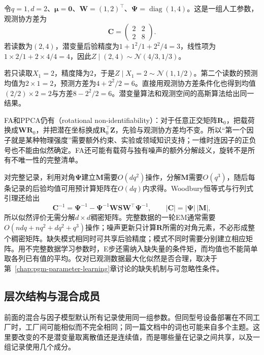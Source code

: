 \begin{example}[两台传感器对一个连续因子的测量]
  \label{ex:pgm-static-directed-fa-missing}
  令$q=1,d=2$、$\bm{\mu}=\bm{0}$、$\bm{W}=(1,2)^\top$、$\bm{\Psi}=\operatorname{diag}(1,4)$。这是一组人工参数，观测协方差为
  \[
    \bm{C}=\begin{pmatrix}2&2\\2&8\end{pmatrix}.
  \]
  若读数为$(2,4)$，潜变量后验精度为$1+1^2/1+2^2/4=3$，线性项为$1\times2/1+2\times4/4=4$，因此$Z\mid(2,4)\sim\mathcal{N}(4/3,1/3)$。

  若只读取$X_1=2$，精度降为$2$，于是$Z\mid X_1=2\sim\mathcal{N}(1,1/2)$。第二个读数的预测均值为$2\times1=2$，预测方差为$4+2^2/2=6$。直接用观测协方差条件化也得到均值$(2/2)\times2=2$与方差$8-2^2/2=6$。潜变量算法和观测空间的高斯算法给出同一结果。
\end{example}

FA和PPCA仍有（rotational non-identifiability）：对于任意正交矩阵$\bm{R}_0$，把载荷换成$\bm{W}\bm{R}_0$，并把潜在坐标换成$\bm{R}_0^\top\bm{Z}$，先验与观测协方差均不变。所以“第一个因子就是某种物理强度”需要额外约束、实验或领域知识支持；一维时连因子的正负号也不能由似然确定。FA还可能有载荷与独有噪声的额外分解歧义，旋转不是所有不唯一性的完整清单。

对完整记录，利用对角$\bm{\Psi}$建立$\bm{M}$需要$O(dq^2)$操作，分解$\bm{M}$需要$O(q^3)$，随后每条记录的后验均值可用预计算矩阵在$O(dq)$内求得。Woodbury恒等式与行列式引理还给出
\[
  \bm{C}^{-1}=\bm{\Psi}^{-1}
    -\bm{\Psi}^{-1}\bm{W}\bm{S}\bm{W}^{\top}\bm{\Psi}^{-1},
  \qquad |\bm{C}|=|\bm{\Psi}|\,|\bm{M}|,
\]
所以似然评价无需分解$d\times d$稠密矩阵。完整数据的一轮EM通常需要$O(ndq+nq^2+dq^2+q^3)$操作；噪声更新只计算$\bm{R}$所需的对角元素，不必形成整个稠密矩阵。缺失模式相同时可共享后验精度；模式不同时需要分别建立相应矩阵。用不完整数据学习参数时，E步还需纳入缺失量的条件矩，而均值也不能简单取各列已有值的平均。仅对已观测数据最大化似然是否合理，取决于第~\ref{chap:pgm-parameter-learning}章讨论的缺失机制与可忽略性条件。

\subsection{层次结构与混合成员}
\label{sec:pgm-static-directed-hierarchy-membership}

前面的混合与因子模型默认所有记录使用同一组参数。但同型号设备部署在不同工厂时，工厂间可能相似而不完全相同；同一篇文档中的词也可能来自多个主题。这里要改变的不是潜变量取离散值还是连续值，而是哪些量在记录之间共享，以及一组记录使用几个成分。

